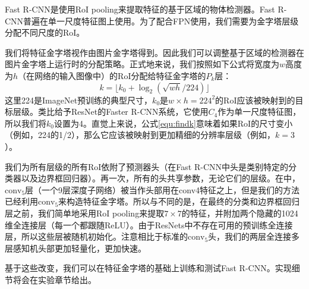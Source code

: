 \documentclass[../main.tex]{subfile}
\begin{document}
Fast R-CNN\cite{fastrcnn}是使用RoI pooling来提取特征的基于区域的物体检测器。Fast R-CNN普遍在单一尺度特征图上使用。为了配合FPN使用，我们需要为金字塔层级分配不同尺度的RoI。

我们将特征金字塔视作由图片金字塔得到。因此我们可以调整基于区域的检测器\cite{spp, fastrcnn}在图片金字塔上运行时的分配策略。正式地来说，我们按照如下公式将宽度为$w$高度为$h$（在网络的输入图像中）的RoI分配给特征金字塔的$P_k$层：
\begin{equation} \label{equ:findk}
    k = \lfloor k_0 + \log_2(\sqrt{wh}/224) \rfloor
\end{equation}
这里224是ImageNet预训练的典型尺寸，$k_0$是$w \times h=224^2$的RoI应该被映射到的目标层级。类比给予ResNet的Faster R-CNN\cite{rpn}系统，它使用$C_4$作为单一尺度特征图，所以我们将$k_0$设置为4。直觉上来说，公式\ref{equ:findk}意味着如果RoI的尺寸变小（例如，224的1/2），那么它应该被映射到更加精细的分辨率层级（例如，$k=3$）。

我们为所有层级的所有RoI依附了预测器头（在Fast R-CNN中头是类别特定的分类器以及边界框回归器）。再一次，所有的头共享参数，无论它们的层级。在\cite{resnet}中，$\text{conv}_5$层（一个9层深度子网络）被当作头部用在conv4特征之上，但是我们的方法已经利用$\text{conv}_5$来构造特征金字塔。所以与\cite{resnet}不同的是，在最终的分类和边界框回归层之前，我们简单地采用RoI pooling来提取$7\times 7$的特征，并附加两个隐藏的1024维全连接层（每一个都跟随ReLU）。由于ResNets中不存在可用的预训练全连接层，所以这些层被随机初始化。注意相比于标准的$\text{conv}_5$头，我们的两层全连接多层感知机头部更加轻量化，更加快速。

基于这些改变，我们可以在特征金字塔的基础上训练和测试Fast R-CNN。实现细节将会在实验章节给出。
\end{document}
